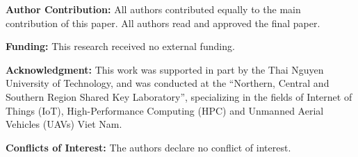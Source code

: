 \documentclass[11pt,a4paper,twoside,asymmetric]{article}
\begin{document}
\graphicspath{{../}}
\def\IJRCSsubmission{}


\noindent \textbf{Author Contribution:} All authors contributed equally
to the main contribution of this paper. All authors read and approved
the final paper.

\noindent \textbf{Funding:} This research received no external funding.

\noindent \textbf{Acknowledgment:} This work was supported in part by the Thai Nguyen University of
Technology, and was conducted at the ``Northern, Central and Southern
Region Shared Key Laboratory'', specializing in the fields of Internet
of Things (IoT), High-Performance Computing (HPC) and Unmanned Aerial
Vehicles (UAVs) Viet Nam.

\noindent \textbf{Conflicts of Interest:} The authors declare no
conflict of interest.

\small{


}
\end{document}
